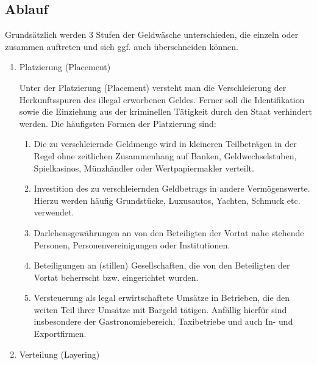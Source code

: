 \documentclass{article}
\begin{document}
        \subsection[Ablauf]{Ablauf}

                Grundsätzlich werden 3 Stufen der Geldwäsche unterschieden, die einzeln oder zusammen auftreten und sich ggf. auch überschneiden können.

                \begin{enumerate}

                    \item Platzierung (Placement)

                        Unter der Platzierung (Placement) versteht man die Verschleierung der Herkunftsspuren des illegal erworbenen Geldes. Ferner soll die Identifikation sowie die Einziehung aus der kriminellen Tätigkeit durch den Staat verhindert werden. Die häufigsten Formen der Platzierung sind:

                        \begin{enumerate}
                            \item
                            Die zu verschleiernde Geldmenge wird in kleineren Teilbeträgen in der Regel ohne zeitlichen Zusammenhang auf Banken, Geldwechselstuben, Spielkasinos, Münzhändler oder Wertpapiermakler verteilt.
                            \item
                            Investition des zu verschleiernden Geldbetrags in andere Vermögenswerte. Hierzu werden häufig Grundstücke, Luxusautos, Yachten, Schmuck etc. verwendet.
                            \item
                            Darlehensgewährungen an von den Beteiligten der Vortat nahe stehende Personen, Personenvereinigungen oder Institutionen.
                            \item
                            Beteiligungen an (stillen) Gesellschaften, die von den Beteiligten der Vortat beherrscht bzw. eingerichtet wurden.
                            \item
                            Versteuerung als legal erwirtschaftete Umsätze in Betrieben, die den weiten Teil ihrer Umsätze mit Bargeld tätigen. Anfällig hierfür sind insbesondere der Gastronomiebereich, Taxibetriebe und auch In- und Exportfirmen.
                        \end{enumerate}

                    \item Verteilung (Layering)


\end{enumerate}
\end{document}
